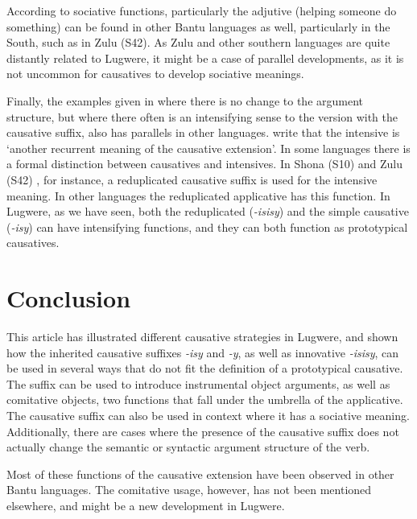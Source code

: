 \documentclass[output=paper,colorlinks,citecolor=brown,draftmode]{langscibook}
\begin{document}
According to \citet{schadeberg2019word} sociative functions, particularly the adjutive (helping someone do something) can be found in other Bantu languages as well, particularly in the South, such as in Zulu (S42). As Zulu and other southern languages are quite distantly related to Lugwere, it might be a case of parallel developments, as it is not uncommon for causatives to develop sociative meanings. 

Finally, the examples given in  where there is no change to the argument structure, but where there often is an intensifying sense to the version with the causative suffix, also has parallels in other languages. \citet{schadeberg2019word} write that the intensive is `another recurrent meaning of the causative extension'. In some languages there is a formal distinction between causatives and intensives. In Shona (S10) and Zulu (S42) , for instance, a reduplicated causative suffix is used for the intensive meaning. In other languages the reduplicated applicative has this function. In Lugwere, as we have seen, both the reduplicated (\emph{-isisy}) and the simple causative (\emph{-isy}) can have intensifying functions, and they can both function as prototypical causatives. 

\section{Conclusion}
This article has illustrated different causative strategies in Lugwere, and shown how the inherited causative suffixes \emph{-isy} and \emph{-y}, as well as innovative \emph{-isisy}, can be used in several ways that do not fit the definition of a prototypical causative. The suffix can be used to introduce instrumental object arguments, as well as comitative objects, two functions that fall under the umbrella of the applicative. The causative suffix can also be used in context where it has a sociative meaning. Additionally, there are cases where the presence of the causative suffix does not actually change the semantic or syntactic argument structure of the verb.  

Most of these functions of the causative extension have been observed in other Bantu languages. The comitative usage, however, has not been mentioned elsewhere, and might be a new development in Lugwere. 
\end{document}

